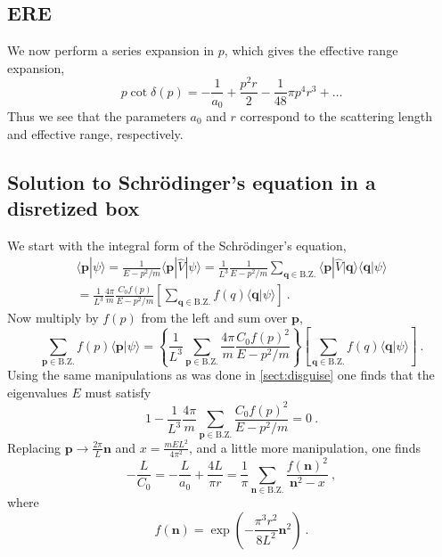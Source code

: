 \documentclass[11pt]{article}
\begin{document}
\subsection{ERE\label{sect:ERE}}
We now perform a series expansion in $p$, which gives the effective range expansion,
\begin{equation}
p\cot\delta(p)=-\frac{1}{a_0}+\frac{p^2 r}{2}-\frac{1}{48} \pi  p^4 r^3+\ldots
\end{equation}
Thus we see that the parameters $a_0$ and $r$ correspond to the scattering length and effective range, respectively.

\subsection{Solution to Schr\"odinger's equation in a disretized box\label{sect:eigenvalues}}
We start with the integral form of the Schr\"odinger's equation,
\begin{multline}
\langle \bm p|\psi\rangle = \frac{1}{E-p^2/m}\langle \bm p|\hat V|\psi\rangle= 
\frac{1}{L^3}\frac{1}{E-p^2/m} \sum_{\bm q\in\mathrm{B.Z.}}\langle\bm p|\hat V|\bm q\rangle\langle\bm q|\psi\rangle\\
=\frac{1}{L^3}\frac{4\pi}{m}\frac{C_0 f(p)}{E-p^2/m} \left[\sum_{\bm q\in\mathrm{B.Z.}}f(q)\langle\bm q|\psi\rangle\right]
\ .
\end{multline}
Now multiply by $f(p)$ from the left and sum over $\bm p$,
\begin{equation}
\sum_{\bm p\in\mathrm{B.Z.}} f(p)\langle\bm p|\psi\rangle=\left\{\frac{1}{L^3}\sum_{\bm p\in\mathrm{B.Z.}}\frac{4\pi}{m}\frac{C_0 f(p)^2}{E-p^2/m} \right\} \left[\sum_{\bm q\in\mathrm{B.Z.}}f(q)\langle\bm q|\psi\rangle\right]\ .
\end{equation}
Using the same manipulations as was done in \autoref{sect:disguise} one finds that the eigenvalues $E$ must satisfy
\begin{equation}
1-\frac{1}{L^3}\frac{4\pi}{m}\sum_{\bm p\in\mathrm{B.Z.}}\frac{C_0 f(p)^2}{E-p^2/m}=0\ .
\end{equation}
Replacing $\bm p \to \frac{2\pi}{L}\bm n$ and $x=\frac{mEL^2}{4\pi^2}$, and a little more manipulation, one finds
\begin{equation}
-\frac{L}{C_0}=\boxed{-\frac{L}{a_0}+\frac{4L}{\pi  r}=\frac{1}{\pi}\sum_{\bm n\in\mathrm{B.Z.}}\frac{f\left(\bm n\right)^2}{\bm n^2-x}}\ ,
\end{equation}
where
\begin{equation}
f(\bm n)=\exp\left(-\frac{\pi ^3  r^2}{8 L^2}\bm n^2\right)\ .
\end{equation}

%
\end{document}
